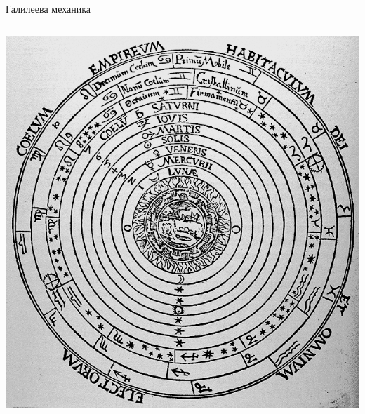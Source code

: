 \documentclass[10pt,a4paper]{beamer}
\begin{document}
        \begin{frame}{ Галилеева механика }
            \begin{columns}
                \begin{column}{0.5\textwidth}
                    \includegraphics[width=\textwidth]{images/aristotel_universe.png}
                \end{column}
            \end{columns}
        \end{frame}
        
\end{document}
